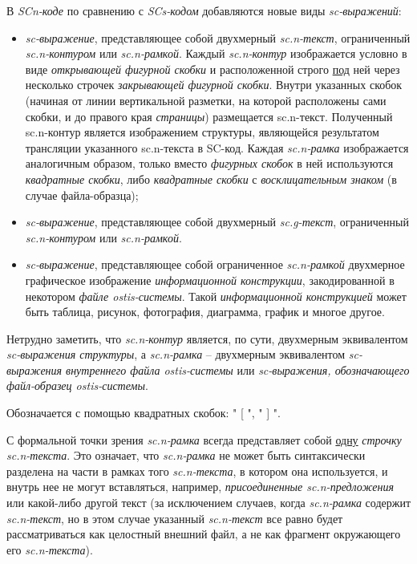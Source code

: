 В \textit{SCn-коде} по сравнению с \textit{SCs-кодом} добавляются новые виды \textit{sc-выражений}:
\begin{itemize}
	\item \textit{sc-выражение}, представляющее собой двухмерный \textit{\mbox{sc.n-текст}}, ограниченный \textit{sc.n-контуром} или \textit{sc.n-рамкой}. Каждый \textit{sc.n-контур} изображается условно в виде \textit{открывающей фигурной скобки} и расположенной строго \uline{под} ней через несколько строчек \textit{закрывающей фигурной скобки}. Внутри указанных скобок (начиная от линии вертикальной разметки, на которой расположены сами скобки, и до правого края \textit{страницы}) размещается sc.n-текст. Полученный sc.n-контур является изображением структуры, являющейся результатом трансляции указанного sc.n-текста в SC-код. Каждая \textit{sc.n-рамка} изображается аналогичным образом, только вместо \textit{фигурных скобок} в ней используются \textit{квадратные скобки}, либо \textit{квадратные скобки} с \textit{восклицательным знаком} (в случае файла-образца);
	\item \textit{sc-выражение}, представляющее собой двухмерный \textit{sc.g-текст}, ограниченный \textit{\mbox{sc.n-контуром}} или \textit{\mbox{sc.n-рамкой}}.
	\item \textit{sc-выражение}, представляющее собой ограниченное \textit{sc.n-рамкой} двухмерное графическое изображение \textit{информационной конструкции}, закодированной в некотором \textit{файле ostis-системы}. Такой \textit{информационной конструкцией} может быть таблица, рисунок, фотография, диаграмма, график и многое другое.
\end{itemize}

Нетрудно заметить, что \textit{sc.n-контур} является, по сути, двухмерным эквивалентом \textit{sc-выражения структуры}, а \textit{sc.n-рамка} -- двухмерным эквивалентом \textit{sc-выражения внутреннего файла \mbox{ostis-системы}} или \textit{sc-выражения, обозначающего файл-образец ostis-системы}.

\begin{SCn}
\end{SCn}

Обозначается с помощью квадратных скобок: " [ "{}, " ] "{}.

С формальной точки зрения \textit{sc.n-рамка} всегда представляет собой \uline{одну} \textit{строчку sc.n-текста}. Это означает, что \textit{sc.n-рамка} не может быть синтаксически разделена на части в рамках того \textit{sc.n-текста}, в котором она используется, и внутрь нее не могут вставляться, например, \textit{присоединенные sc.n-предложения} или какой-либо другой текст (за исключением случаев, когда \textit{sc.n-рамка} содержит \textit{sc.n-текст}, но в этом случае указанный \textit{sc.n-текст} все равно будет рассматриваться как целостный внешний файл, а не как фрагмент окружающего его \textit{sc.n-текста}). 

